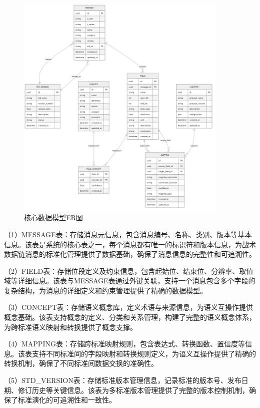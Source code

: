 \begin{figure}[H]
    \centering
    \includegraphics[width=0.9\textwidth]{chapters/fig-0/data_model.png}
    \caption{核心数据模型ER图}
    \label{fig:data_model}
\end{figure}

（1）MESSAGE表：存储消息元信息，包含消息编号、名称、类别、版本等基本信息。该表是系统的核心表之一，每个消息都有唯一的标识符和版本信息，为战术数据链消息的标准化管理提供了数据基础，确保了消息信息的完整性和可追溯性。

（2）FIELD表：存储位段定义及约束信息，包含起始位、结束位、分辨率、取值域等详细信息。该表与MESSAGE表通过外键关联，支持一个消息包含多个字段的复杂结构，为消息的详细定义和约束管理提供了精确的数据模型。

（3）CONCEPT表：存储语义概念库，定义术语与来源信息，为语义互操作提供概念基础。该表支持概念的定义、分类和关系管理，构建了完整的语义概念体系，为跨标准语义映射和转换提供了概念支撑。

（4）MAPPING表：存储跨标准映射规则，包含表达式、转换函数、置信度等信息。该表支持不同标准间的字段映射和转换规则定义，为语义互操作提供了精确的转换机制，确保了不同标准间数据交换的准确性。

（5）STD\_VERSION表：存储标准版本管理信息，记录标准的版本号、发布日期、修订历史等关键信息。该表为多标准版本管理提供了完整的版本控制机制，确保了标准演化的可追溯性和一致性。

